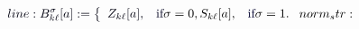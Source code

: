 \documentclass[12pt]{article}
\begin{document}
\makeatletter
\renewcommand*{\@textcolor}[3]{%
  \protect\leavevmode
  \begingroup
    \color#1{#2}#3%
  \endgroup
}
\makeatother
\begin{displaymath}
\mathcolor[RGB]{0,0,15}{line:
B_{k\ell}^{\sigma}[a]:=\left\{\begin{array}[c]{ccc}Z_{k\ell}[a],} & \mathcolor[RGB]{0,0,30}{\text{if} }\sigma=0,S_{k\ell}[a], & \mathcolor[RGB]{0,0,45}{\text{if} }\sigma=1.\end{array}\right.

norm_str:
\end{displaymath}
\end{document}
